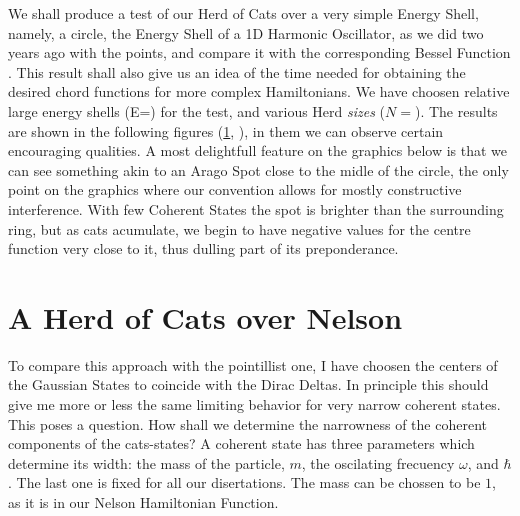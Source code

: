 \documentclass[a4paper,12pt]{article}
\begin{document}
We shall produce a  test of our Herd of Cats over a very simple
Energy Shell, namely, a circle, the Energy Shell of a 1D Harmonic Oscillator,
as we did two years ago with the points, and compare it with the corresponding
Bessel Function \cite{BerryRIR}. This result shall also give us an idea of the 
time needed for obtaining the desired chord functions for more complex
Hamiltonians. We have choosen relative large energy shells (E=) for the test,
and various Herd \emph{sizes} ($N=$). The results are shown in the
following figures (\ref{}, ), in them  we can observe certain encouraging 
qualities. A most delightfull feature on the graphics below is that we can
see something akin to an  Arago Spot \cite{Arago} 
close to the midle of the circle, the only point
on the graphics where our convention allows for mostly constructive 
interference. With few Coherent States the spot is brighter than the
surrounding ring, but as cats acumulate, we begin to have negative values
for the centre function very close to it, thus dulling part of its
preponderance. 


\section{A Herd of Cats over Nelson}

To compare this approach with the pointillist one, I have choosen the centers
of the Gaussian States to coincide with the Dirac Deltas. 
In principle this should give me more or less the same limiting behavior for 
very narrow coherent states.  This poses a question. 
How shall we determine the narrowness of the coherent components of the cats-states? 
A coherent state has three parameters which determine its width:
the mass of the particle, $m$, the oscilating frecuency $\omega$, and $\hbar$. 
The last one is fixed for all our disertations. 
The mass can be chossen to be $1$, as it is in our Nelson Hamiltonian Function.






\end{document}
